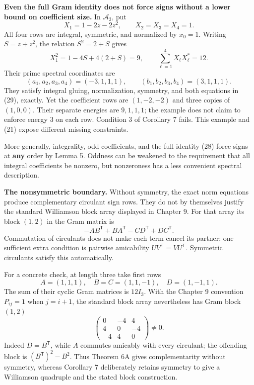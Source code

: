 \documentclass[
  11pt,
]{article}
\begin{document}
\textbf{Even the full Gram identity does not force signs without a lower
bound on coefficient size.} In \(\mathcal A_3\), put \[
 X_1=1-2z-2z^2,\qquad X_2=X_3=X_4=1.                     \tag{30}
\] All four rows are integral, symmetric, and normalized by \(x_0=1\).
Writing \(S=z+z^2\), the relation \(S^2=2+S\) gives \[
 X_1^2=1-4S+4(2+S)=9,\qquad
 \sum_{\ell=1}^4X_\ell X_\ell^*=12.
 \] Their prime spectral coordinates are \[
 (a_1,a_2,a_3,a_4)=(-3,1,1,1),\qquad
 (b_1,b_2,b_3,b_4)=(3,1,1,1).
 \] They satisfy integral gluing, normalization, symmetry, and both
equations in (29), exactly. Yet the coefficient rows are \((1,-2,-2)\)
and three copies of \((1,0,0)\). Their separate energies are
\(9,1,1,1\); the example does not claim to enforce energy \(3\) on each
row. Condition 3 of Corollary 7 fails. This example and (21) expose
different missing constraints.

More generally, integrality, odd coefficients, and the full identity
(28) force signs at \textbf{any} order by Lemma 5. Oddness can be
weakened to the requirement that all integral coefficients be nonzero,
but nonzeroness has a less convenient spectral description.

\textbf{The nonsymmetric boundary.} Without symmetry, the exact norm
equations produce complementary circulant sign rows. They do not by
themselves justify the standard Williamson block array displayed in
Chapter 9. For that array its block \((1,2)\) in the Gram matrix is \[
                  -AB^{\mathsf T}+BA^{\mathsf T}
                  -CD^{\mathsf T}+DC^{\mathsf T}.
 \] Commutation of circulants does not make each term cancel its
partner: one sufficient extra condition is pairwise amicability
\(UV^{\mathsf T}=VU^{\mathsf T}\). Symmetric circulants satisfy this
automatically.

For a concrete check, at length three take first rows \[
 A=(1,1,1),\quad B=C=(1,1,-1),\quad D=(1,-1,1).
 \] The sum of their cyclic Gram matrices is \(12I_3\). With the Chapter
9 convention \(P_{ij}=1\) when \(j=i+1\), the standard block array
nevertheless has Gram block \((1,2)\) \[
 \begin{pmatrix}
 0&-4&4\\4&0&-4\\-4&4&0
 \end{pmatrix}\ne0.
 \] Indeed \(D=B^{\mathsf T}\), while \(A\) commutes amicably with every
circulant; the offending block is \((B^{\mathsf T})^2-B^2\). Thus
Theorem 6A gives complementarity without symmetry, whereas Corollary 7
deliberately retains symmetry to give a Williamson quadruple and the
stated block construction.
\end{document}
